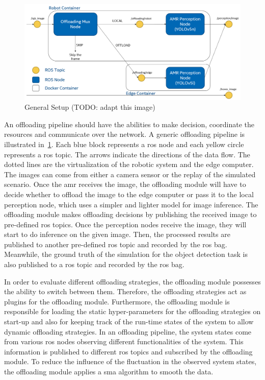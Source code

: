 \begin{figure}[htp]
    \centering
    \includegraphics[width=120mm]{figures/setup/general_setup.png}
    \caption{General Setup (TODO: adapt this image)}
    \label{fig:general_setup}
\end{figure}

An offloading pipeline should have the abilities to make decision, coordinate the resources and communicate over the network. A generic offloading pipeline is illustrated in~\cref{fig:general_setup}. Each blue block represents a \gls{ros} node and each yellow circle represents a \gls{ros} topic. The arrows indicate the directions of the data flow. The dotted lines are the virtualization of the robotic system and the edge computer. The images can come from either a camera sensor or the replay of the simulated scenario. Once the \gls{amr} receives the image, the offloading module will have to decide whether to offload the image to the edge computer or pass it to the local perception node, which uses a simpler and lighter model for image inference. The offloading module makes offloading decisions by publishing the received image to pre-defined \gls{ros} topics. Once the perception nodes receive the image, they will start to do inference on the given image. Then, the processed results are published to another pre-defined \gls{ros} topic and recorded by the \gls{ros} bag. Meanwhile, the ground truth of the simulation for the object detection task is also published to a \gls{ros} topic and recorded by the \gls{ros} bag. 

In order to evaluate different offloading strategies, the offloading module possesses the ability to switch between them. Therefore, the offloading strategies act as plugins for the offloading module. Furthermore, the offloading module is responsible for loading the static hyper-parameters for the offloading strategies on start-up and also for keeping track of the run-time states of the system to allow dynamic offloading strategies. In an offloading pipeline, the system states come from various \gls{ros} nodes observing different functionalities of the system. This information is published to different \gls{ros} topics and subscribed by the offloading module. To reduce the influence of the fluctuation in the observed system states, the offloading module applies a \gls{sma} algorithm to smooth the data. 

